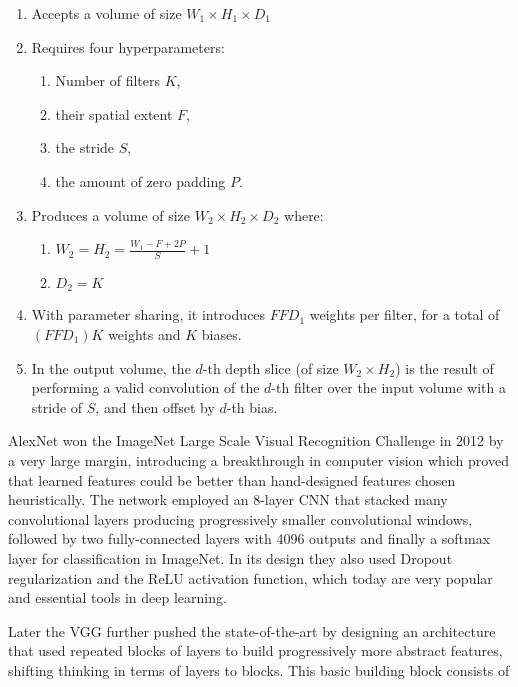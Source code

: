 \begin{enumerate}
    \item Accepts a volume of size $W_1 \times H_1 \times D_1$
    \item Requires four hyperparameters:
    \begin{enumerate}
        \item Number of filters $K$,
        \item their spatial extent $F$,
        \item the stride $S$,
        \item the amount of zero padding $P$.
    \end{enumerate}
    \item Produces a volume of size $W_2 \times H_2 \times D_2$ where:
    \begin{enumerate}
        \item $W_2 = H_2 = \frac{W_1 - F + 2P}{S} + 1$
        \item $D_2 = K$
    \end{enumerate}
    \item With parameter sharing, it introduces $F F D_1$ weights per filter, for a total of $(F F D_1) K$ weights and $K$ biases.
    \item In the output volume, the $d$-th depth slice (of size $W_2 \times H_2$) is the result of performing a valid convolution of the $d$-th filter over the input volume with a stride of $S$, and then offset by $d$-th bias.
\end{enumerate}

AlexNet\cite{alexnet} won the ImageNet Large Scale Visual Recognition Challenge \cite{imagenet} in 2012 by a very large margin, introducing a breakthrough in computer vision which proved that learned features could be better than hand-designed features chosen heuristically. The network employed an 8-layer \ac{CNN} that stacked many convolutional layers producing progressively smaller convolutional windows, followed by two fully-connected layers with 4096 outputs and finally a softmax layer for classification in ImageNet. In its design they also used Dropout regularization and the ReLU activation function, which today are very popular and essential tools in deep learning.

Later the \ac{VGG} further pushed the state-of-the-art by designing an architecture that used repeated blocks of layers to build progressively more abstract features, shifting thinking in terms of layers to blocks. This basic building block consists of

